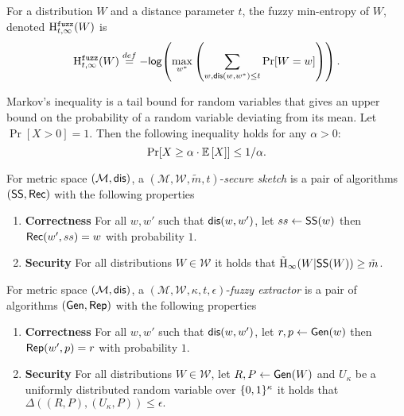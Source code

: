 \begin{definition}

For a distribution $W$ and a distance parameter $t$, the fuzzy min-entropy of $W$, denoted $\mathrm{H}^{\mathtt{fuzz}}_{t,\infty}(W)$ is 
\[
\mathrm{H}^{\mathtt{fuzz}}_{t,\infty}(W) \overset{def}= -\mathsf{log}\!\left( \max_{w^*} \left(\sum_{w, \mathsf{dis}(w, w^*)\le t} \Pr[W=w] \right)\right).
\]
\end{definition}

\begin{definition}
    Markov's inequality is a tail bound for random variables that gives an upper bound on the probability of a random variable deviating from its mean. Let $\Pr[X>0] = 1$. Then the following inequality holds for any $\alpha > 0$: 
    \[ 
      \Pr\!\left[X \geq \alpha \cdot \operatorname*{\mathbb{E}}\left[X\right]\right] \leq 1/\alpha .
    \]
\end{definition}

\begin{definition}
For metric space $(\mathcal{M}, \mathsf{dis})$, a $(\mathcal{M}, \mathcal{W}, \tilde{m}, t)$-\emph{secure sketch} is a pair of algorithms $({\mathsf{SS}}, {\mathsf{Rec}})$ with the following properties 
\begin{enumerate} 
\itemsep0em
\item \textbf{Correctness} For all $w, w'$ such that $\mathsf{dis}(w, w')$, let $ss \leftarrow {\ensuremath{\mathsf{SS}}}(w)$ then ${\mathsf{Rec}}(w', ss) = w$ with probability $1$. 
\item \textbf{Security} For all distributions $W \in \mathcal{W}$ it holds that $\tilde{\mathrm{H}}_\infty(W | {\mathsf{SS}}(W)) \ge \tilde{m}$.
\end{enumerate}
\end{definition}

\begin{definition}
For metric space $(\mathcal{M}, \mathsf{dis})$, a $(\mathcal{M}, \mathcal{W}, \kappa, t, \epsilon)$-\emph{fuzzy extractor} is a pair of algorithms $({\mathsf{Gen}}, {\mathsf{Rep}})$ with the following properties 
\begin{enumerate} 
\itemsep0em
\item \textbf{Correctness} For all $w, w'$ such that $\mathsf{dis}(w, w')$, let $r, p \leftarrow {\ensuremath{\mathsf{Gen}}}(w)$ then ${\mathsf{Rep}}(w', p) = r$ with probability $1$. 
\item \textbf{Security} For all distributions $W \in \mathcal{W}$, let $R, P \leftarrow {\ensuremath{\mathsf{Gen}}}(W)$ and $U_\kappa$ be a uniformly distributed random variable over $\{0, 1\}^\kappa$ it holds that $\Delta((R, P), (U_\kappa, P))\le \epsilon.$
\end{enumerate}
\end{definition}

